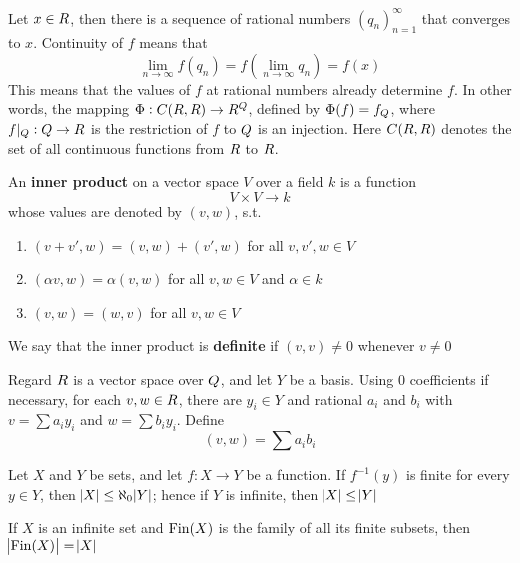 \documentclass[11pt]{article}
\begin{document}
Let \(x\in\relax{R}\), then there is a sequence of rational numbers
\((q_n)_{n=1}^\infty\) that converges to \(x\). Continuity of \(f\) means that
\begin{equation*}
\lim_{n\to\infty}f(q_n)=f(\lim_{n\to\infty}q_n)=f(x)
\end{equation*}
This means that the values of \(f\) at rational numbers already determine \(f\).
In other words, the mapping \(\Phi:C(\relax{R},\relax{R})\to\relax{R}^{\relax{Q}}\), defined by
\(\Phi(f)=f_{\relax{Q}}\), where \(f|_{\relax{Q}}:\relax{Q}\to\relax{R}\) is the restriction of \(f\) to \(\relax{Q}\) is
an injection. 
Here \(C(\relax{R},\relax{R})\) denotes the set of all continuous functions from \(\relax{R}\) to
\(\relax{R}\). 

\begin{examplle}[]
An \textbf{inner product} on a vector space \(V\) over a field \(k\) is a function 
\begin{equation*}
V\times V\to k
\end{equation*}
whose values are denoted by \((v,w)\), s.t.
\begin{enumerate}
\item \((v+v',w)=(v,w)+(v',w)\) for all \(v,v',w\in V\)
\item \((\alpha v,w)=\alpha(v,w)\) for all \(v,w\in V\) and \(\alpha\in k\)
\item \((v,w)=(w,v)\) for all \(v,w\in V\)
\end{enumerate}


We say  that the inner product is \textbf{definite} if \((v,v)\neq 0\) whenever
\(v\neq 0\)

Regard \(\relax{R}\) is a vector space over \(\relax{Q}\), and let \(Y\) be a  basis. Using 0
coefficients if necessary, for each \(v,w\in\relax{R}\), there are \(y_i\in Y\) and
rational \(a_i\) and \(b_i\) with \(v=\sum a_iy_i\) and \(w=\sum b_iy_i\).
Define
\begin{equation*}
 (v,w)=\sum a_ib_i
\end{equation*}
\end{examplle}

\begin{lemma}[]
\label{fact1}
Let \(X\) and \(Y\) be sets, and let \(f:X\to Y\) be a function. If
\(f^{-1}(y)\) is finite for every \(y\in Y\), then 
\(\abs{X}\le\aleph_0\abs{Y}\); hence if \(Y\) is infinite, then
\(\abs{X}\le\abs{Y}\) 
\end{lemma}

\begin{lemma}[]
\label{fact2}
If \(X\) is an infinite set and \(\operatorname{Fin}(X)\) is the family of all its finite
subsets, then \(\abs{\operatorname{Fin}(X)}=\abs{X}\)
\end{lemma}
\end{document}
